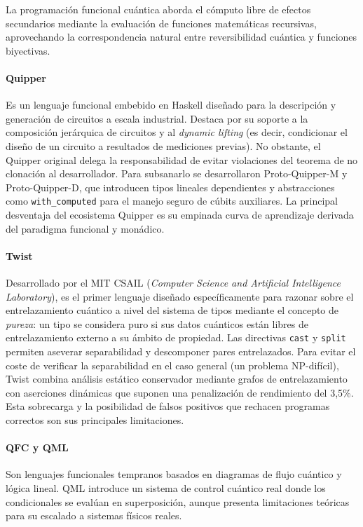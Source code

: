 La programación funcional cuántica aborda el cómputo libre de efectos secundarios mediante la evaluación de funciones matemáticas recursivas, aprovechando la correspondencia natural entre reversibilidad cuántica y funciones biyectivas.

\paragraph{Quipper}
Es un lenguaje funcional embebido en Haskell diseñado para la descripción y generación de circuitos a escala industrial. Destaca por su soporte a la composición jerárquica de circuitos y al \textit{dynamic lifting} (es decir, condicionar el diseño de un circuito a resultados de mediciones previas). No obstante, el Quipper original delega la responsabilidad de evitar violaciones del teorema de no clonación al desarrollador. Para subsanarlo se desarrollaron Proto-Quipper-M y Proto-Quipper-D, que introducen tipos lineales dependientes y abstracciones como \lstinline|with_computed| para el manejo seguro de cúbits auxiliares. La principal desventaja del ecosistema Quipper es su empinada curva de aprendizaje derivada del paradigma funcional y monádico.

\paragraph{Twist}
Desarrollado por el MIT CSAIL (\textit{Computer Science and Artificial Intelligence Laboratory}), es el primer lenguaje diseñado específicamente para razonar sobre el entrelazamiento cuántico a nivel del sistema de tipos mediante el concepto de \textit{pureza}: un tipo se considera puro si sus datos cuánticos están libres de entrelazamiento externo a su ámbito de propiedad. Las directivas \lstinline|cast| y \lstinline|split| permiten aseverar separabilidad y descomponer pares entrelazados. Para evitar el coste de verificar la separabilidad en el caso general (un problema NP-difícil), Twist combina análisis estático conservador mediante grafos de entrelazamiento con aserciones dinámicas que suponen una penalización de rendimiento del 3,5\%. Esta sobrecarga y la posibilidad de falsos positivos que rechacen programas correctos son sus principales limitaciones.

\paragraph{QFC y QML}
Son lenguajes funcionales tempranos basados en diagramas de flujo cuántico y lógica lineal. QML introduce un sistema de control cuántico real donde los condicionales se evalúan en superposición, aunque presenta limitaciones teóricas para su escalado a sistemas físicos reales.

